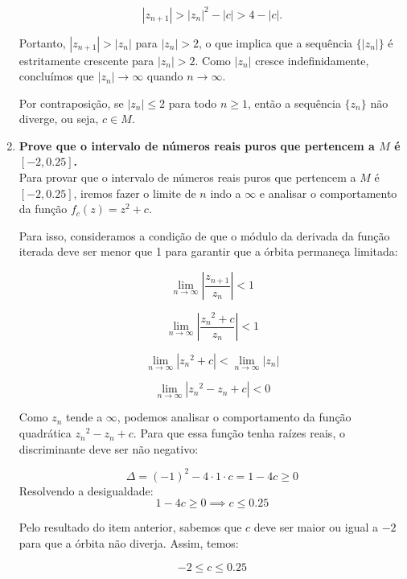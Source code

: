 \begin{enumerate}[label=(\alph*)]
        \[
        |z_{n+1}| > |z_n|^2 - |c| > 4 - |c|.
        \]

        Portanto, \( |z_{n+1}| > |z_n| \) para \( |z_n| > 2 \), o que implica que a sequência \( \{|z_n|\} \) é estritamente crescente para \( |z_n| > 2 \). Como \( |z_n| \) cresce indefinidamente, concluímos que \( |z_n| \to \infty \) quando \( n \to \infty \).

        Por contraposição, se \( |z_n| \leq 2 \) para todo \( n \geq 1 \), então a sequência \( \{z_n\} \) não diverge, ou seja, \( c \in M \).


    \item \textbf{Prove que o intervalo de números reais puros que pertencem a \( M \) é \( [-2, 0.25] \). }\\
    
        Para provar que o intervalo de números reais puros que pertencem a \( M \) é \( [-2, 0.25] \), iremos fazer o limite de \( n \) indo a \( \infty \) e analisar o comportamento da função \( f_c(z) = z^2 + c \).

        Para isso, consideramos a condição de que o módulo da derivada da função iterada deve ser menor que 1 para garantir que a órbita permaneça limitada:

        \[
        \lim_{n \to \infty} \left| \frac{z_{n+1}}{z_n} \right| < 1
        \]

        \[
        \lim_{n \to \infty} \left| \frac{{z_n}^2 + c}{z_n} \right| < 1
        \]

        \[
        \lim_{n \to \infty} \left| {z_n}^2 + c \right| < \lim_{n \to \infty} \left| z_n \right| 
        \]

        \[
        \lim_{n \to \infty} \left| {z_n}^2  -z_n + c \right| < 0
        \]

        Como \( z_n \) tende a \( \infty \), podemos analisar o comportamento da função quadrática \( {z_n}^2 - z_n + c \). Para que essa função tenha raízes reais, o discriminante deve ser não negativo:

        \[
        \Delta = (-1)^2 - 4 \cdot 1 \cdot
        c = 1 - 4c \geq 0
        \]
        Resolvendo a desigualdade:
        \[
        1 - 4c \geq 0 \implies c \leq 0.25
        \]


        Pelo resultado do item anterior, sabemos que \( c \) deve ser maior ou igual a \( -2 \) para que a órbita não diverja. Assim, temos:

        \[
        -2 \leq c \leq 0.25
        \]



\end{enumerate}